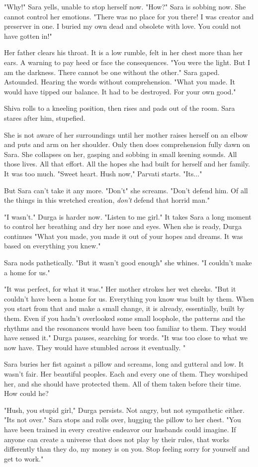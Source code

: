 \documentclass{article}
\begin{document}
"Why!" Sara yells, unable to stop herself now. "How?" Sara is sobbing now. She cannot control her emotions. "There was no place for you there! I was creator and preserver in one. I buried my own dead and obsolete with love. You could not have gotten in!"

Her father clears his throat. It is a low rumble, felt in her chest more than her ears. A warning to pay heed or face the consequences. "You were the light. But I am the darkness. There cannot be one without the other." Sara gaped. Astounded. Hearing the words without comprehension. "What you made. It would have tipped our balance. It had to be destroyed. For your own good." 

Shiva rolls to a kneeling position, then rises and pads out of the room. Sara stares after him, stupefied.

She is not aware of her surroundings until her mother raises herself on an elbow and puts and arm on her shoulder. Only then does comprehension fully dawn on Sara. She collapses on her, gasping and sobbing in small keening sounds. All those lives. All that effort. All the hopes she had built for herself and her family. It was too much. "Sweet heart. Hush now," Parvati starts. "Its..."

But Sara can't take it any more. "Don't" she screams. "Don't defend him. Of all the things in this wretched creation, \emph{don't} defend that horrid man." 

"I wasn't." Durga is harder now. "Listen to me girl." It takes Sara a long moment to control her breathing and dry her nose and eyes. When she is ready, Durga continues "What you made, you made it out of your hopes and dreams. It was based on everything you knew." 

Sara nods pathetically. "But it wasn't good enough" she whines. "I couldn't make a home for us."

"It was perfect, for what it was." Her mother strokes her wet cheeks. "But it couldn't have been a home for us. Everything you know was built by them. When you start from that and make a small change, it is already, essentially, built by them. Even if you hadn't overlooked some small loophole, the patterns and the rhythms and the resonances would have been too familiar to them. They would have sensed it." Durga pauses, searching for words. "It was too close to what we now have. They would have stumbled across it eventually. "

Sara buries her fist against a pillow and screams, long and gutteral and low. It wasn't fair. Her beautiful peoples. Each and every one of them. They worshiped her, and she should have protected them. All of them taken before their time. How could he? 

"Hush, you stupid girl," Durga persists. Not angry, but not sympathetic either. "Its not over." Sara stops and rolls over, hugging the pillow to her chest. "You have been trained in every creative endeavor our husbands could imagine. If anyone can create a universe that does not play by their rules, that works differently than they do, my money is on you. Stop feeling sorry for yourself and get to work."
\end{document}
